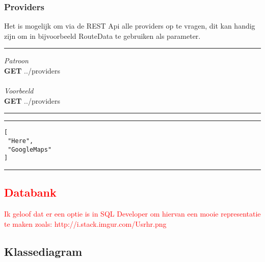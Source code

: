 \documentclass[ps,a4paper,oneside]{report}
\begin{document}
\subsubsection{Providers}
Het is mogelijk om via de REST Api alle providers op te vragen, dit kan handig zijn om in bijvoorbeeld RouteData te gebruiken als parameter.\\
\noindent\rule[0.5ex]{\linewidth}{1pt}
\textit{Patroon}\\
\textbf{GET} ../providers\\\\
\textit{Voorbeeld}\\
\textbf{GET} ../providers\\
\noindent\rule[0.5ex]{\linewidth}{1pt}
\noindent\rule[0.5ex]{\linewidth}{1pt}
\begin{verbatim}
[
 "Here",
 "GoogleMaps"
]
\end{verbatim}
\noindent\rule[0.5ex]{\linewidth}{1pt}
\textcolor{red}{\subsection{Databank}
Ik geloof dat er een optie is in SQL Developer om hiervan een mooie representatie te maken zoals: http://i.stack.imgur.com/Usrhr.png }
\subsection{Klassediagram}
\end{document}
